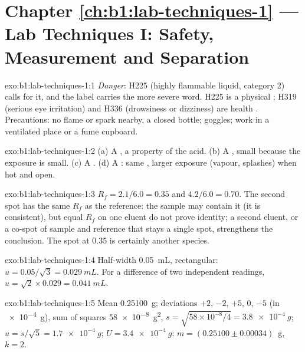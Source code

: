 \section*{Chapter \ref{ch:b1:lab-techniques-1} --- Lab Techniques I: Safety, Measurement and Separation}

\begin{solution}{exo:b1:lab-techniques-1:1}
\emph{Danger}: H225 (highly flammable liquid, category 2) calls for it, and
the label carries the more severe word. H225 is a physical ; H319
(serious eye irritation) and H336 (drowsiness or dizziness) are health
. Precautions: no flame or spark nearby, a closed bottle; goggles;
work in a ventilated place or a fume cupboard.
\end{solution}

\begin{solution}{exo:b1:lab-techniques-1:2}
(a) A , a property of the acid. (b) A , small because the
exposure is small. (c) A . (d) A : same , larger exposure
(vapour, splashes) when hot and open.
\end{solution}

\begin{solution}{exo:b1:lab-techniques-1:3}
$R_f = 2.1/6.0 = 0.35$ and $4.2/6.0 = 0.70$. The second spot has the same
$R_f$ as the reference: the sample may contain it (it is consistent), but
equal $R_f$ on one eluent do not prove identity; a second eluent, or a
co-spot of sample and reference that stays a single spot, strengthens the
conclusion. The spot at 0.35 is certainly another species.
\end{solution}

\begin{solution}{exo:b1:lab-techniques-1:4}
Half-width \qty{0.05}{mL}, rectangular: $u = 0.05/\sqrt3 = \qty{0.029}{mL}$.
For a difference of two independent readings,
$u = \sqrt{2} \times 0.029 = \qty{0.041}{mL}$.
\end{solution}

\begin{solution}{exo:b1:lab-techniques-1:5}
Mean \qty{0.25100}{g}; deviations $+2$, $-2$, $+5$, 0, $-5$ (in
\qty{e-4}{g}), sum of squares \qty{58e-8}{g^2}, $s = \sqrt{58 \times
10^{-8}/4} = \qty{3.8e-4}{g}$; $u = s/\sqrt5 = \qty{1.7e-4}{g}$;
$U = \qty{3.4e-4}{g}$: $m = (0.25100 \pm 0.00034)$~g, $k = 2$.
\end{solution}

